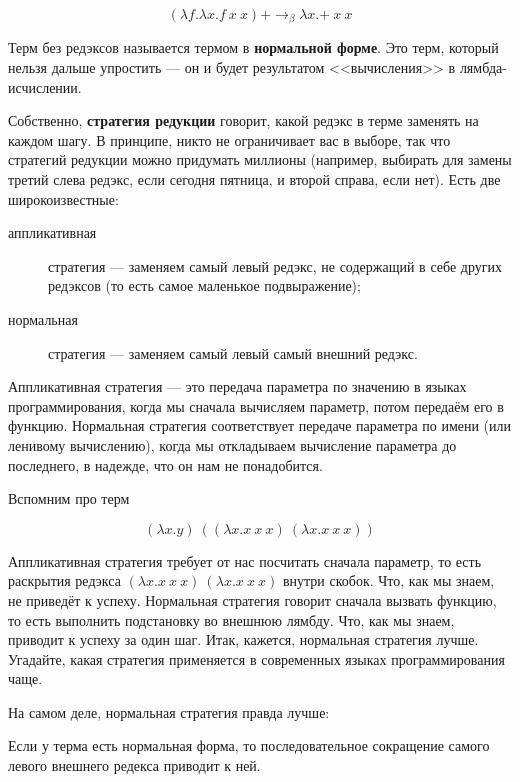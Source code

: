 \documentclass{../../text-style}
\begin{document}
$$(\lambda f.\lambda x.f\ x\ x) \textbf{+} \rightarrow_\beta \lambda x.\textbf{+}\ x\ x$$

Терм без редэксов называется термом в \textbf{нормальной форме}. Это терм, который нельзя дальше упростить --- он и будет результатом <<вычисления>> в лямбда-исчислении.

Собственно, \textbf{стратегия редукции} говорит, какой редэкс в терме заменять на каждом шагу. В принципе, никто не ограничивает вас в выборе, так что стратегий редукции можно придумать миллионы (например, выбирать для замены третий слева редэкс, если сегодня пятница, и второй справа, если нет). Есть две широкоизвестные:

\begin{description}
    \item[аппликативная] стратегия --- заменяем самый левый редэкс, не содержащий в себе других редэксов (то есть самое маленькое подвыражение);
    \item[нормальная] стратегия --- заменяем самый левый самый внешний редэкс.
\end{description}

Аппликативная стратегия --- это передача параметра по значению в языках программирования, когда мы сначала вычисляем параметр, потом передаём его в функцию. Нормальная стратегия соответствует передаче параметра по имени (или ленивому вычислению), когда мы откладываем вычисление параметра до последнего, в надежде, что он нам не понадобится.

Вспомним про терм

$$(\lambda x.y)\ ((\lambda x.x\ x\ x)\ (\lambda x.x\ x\ x))$$

Аппликативная стратегия требует от нас посчитать сначала параметр, то есть раскрытия редэкса $(\lambda x.x\ x\ x)\ (\lambda x.x\ x\ x)$ внутри скобок. Что, как мы знаем, не приведёт к успеху. Нормальная стратегия говорит сначала вызвать функцию, то есть выполнить подстановку во внешнюю лямбду. Что, как мы знаем, приводит к успеху за один шаг. Итак, кажется, нормальная стратегия лучше. Угадайте, какая стратегия применяется в современных языках программирования чаще.

На самом деле, нормальная стратегия правда лучше: 

\begin{rustheorem}
    Если у терма есть нормальная форма, то последовательное сокращение самого левого внешнего редекса приводит к ней.
\end{rustheorem}
\end{document}
